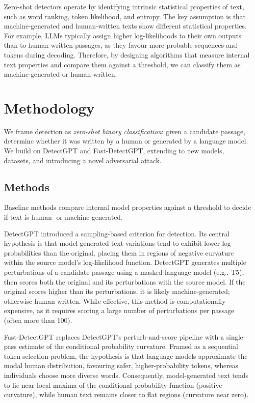 \documentclass[11pt]{article}
\begin{document}
Zero-shot detectors operate by identifying intrinsic statistical properties of text, such as word ranking, token likelihood, and entropy. The key assumption is that machine-generated and human-written texts show different statistical properties. For example, LLMs typically assign higher log-likelihoods to their own outputs than to human-written passages, as they favour more probable sequences and tokens during decoding. Therefore, by designing algorithms that measure internal text properties and compare them against a threshold, we can classify them as machine-generated or human-written.


\section{Methodology}\label{sec:methodology}

We frame detection as \textit{zero-shot binary classification}: given a candidate passage, determine whether it was written by a human or generated by a language model. We build on DetectGPT and Fast-DetectGPT, extending to new models, datasets, and introducing a novel adversarial attack.

\subsection{Methods}

Baseline methods compare internal model properties against a threshold to decide if text is human- or machine-generated.

DetectGPT \cite{detectgpt} introduced a sampling-based criterion for detection. Its central hypothesis is that model-generated text variations tend to exhibit lower log-probabilities than the original, placing them in regions of negative curvature within the source model’s log-likelihood function. DetectGPT generates multiple perturbations of a candidate passage using a masked language model (e.g., T5), then scores both the original and its perturbations with the source model. If the original scores higher than its perturbations, it is likely machine-generated; otherwise human-written. While effective, this method is computationally expensive, as it requires scoring a large number of perturbations per passage (often more than 100).

Fast-DetectGPT replaces DetectGPT’s perturb-and-score pipeline with a single-pass estimate of the conditional probability curvature. Framed as a sequential token selection problem, the hypothesis is that language models approximate the modal human distribution, favouring safer, higher-probability tokens, whereas individuals choose more diverse words. Consequently, model-generated text tends to lie near local maxima of the conditional probability function (positive curvature), while human text remains closer to flat regions (curvature near zero). 
\end{document}
